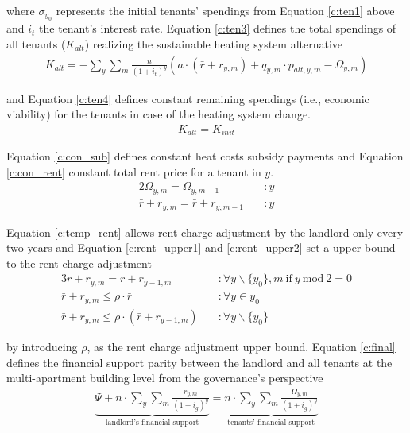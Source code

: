where $\sigma_{y_0}$ represents the initial tenants' spendings from Equation \ref{c:ten1} above and $i_t$ the tenant's interest rate. Equation \ref{c:ten3} defines the total spendings of all tenants ($K_{alt}$) realizing the sustainable heating system alternative
\begin{align}\label{c:ten3}
	K_{alt} = -\sum_{y} \sum_{m} \frac{n}{(1+i_{t})^y} \left(a \cdot (\bar{r} + r_{y,m}) + q_{y,m} \cdot p_{alt,y,m}-\Omega_{y,m} \right)
\end{align}

and Equation \ref{c:ten4} defines constant remaining spendings (i.e., economic viability) for the tenants in case of the heating system change.
\begin{align}\label{c:ten4}
K_{alt} = K_{init}
\end{align}

Equation \ref{c:con_sub} defines constant heat costs subsidy payments and Equation \ref{c:con_rent} constant total rent price for a tenant in $y$.
\begin{alignat}{2}
\Omega_{y,m} = \Omega_{y,m-1} \quad &:y\label{c:con_sub}\\
\bar{r} + r_{y,m} = \bar{r} + r_{y,m-1} \quad &:y\label{c:con_rent}
\end{alignat}

Equation \ref{c:temp_rent} allows rent charge adjustment by the landlord only every two years and Equation \ref{c:rent_upper1} and \ref{c:rent_upper2} set a upper bound to the rent charge adjustment
\begin{alignat}{3}
\bar{r} + r_{y,m} = \bar{r} + r_{y-1,m} \quad &:\forall y\backslash \{y_0\},m~\text{if}~y~\text{mod}~2=0\label{c:temp_rent}\\
\bar{r}+r_{y,m} \leq \rho \cdot \bar{r} \quad &:\forall y \in {y_0}\label{c:rent_upper1}\\
\bar{r}+r_{y,m} \leq \rho \cdot \left(\bar{r}+r_{y-1,m}\right) \quad &:\forall y\backslash \{y_0\}\label{c:rent_upper2}
\end{alignat}

by introducing $\rho$, as the rent charge adjustment upper bound. Equation \ref{c:final} defines the financial support parity between the landlord and all tenants at the multi-apartment building level from the governance's perspective 
\begin{align}\label{c:final}
\underbrace{\Psi +  n \cdot \sum_{y} \sum_{m} \frac{r_{y,m}}{(1+i_{g})^y}}_{\text{landlord's financial support}}= \underbrace{n \cdot \sum_{y} \sum_{m} \frac{\Omega_{y,m}}{(1+i_{g})^y}}_{\text{tenants' financial support}}
\end{align}


